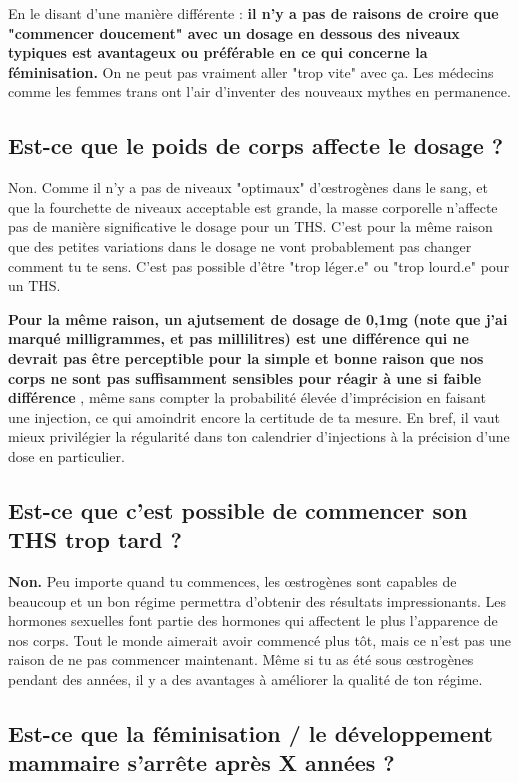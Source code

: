 \documentclass{article}
\begin{document}
En le disant d'une manière différente : \textbf{il n'y a pas de raisons de croire que "commencer doucement" avec un dosage en dessous des niveaux typiques est avantageux ou préférable en ce qui concerne la féminisation.} On ne peut pas vraiment aller "trop vite" avec ça. Les médecins comme les femmes trans ont l'air d'inventer des nouveaux mythes en permanence. 

\subsection{Est-ce que le poids de corps affecte le dosage ?}

Non. Comme il n'y a pas de niveaux "optimaux" d'œstrogènes dans le sang, et que la fourchette de niveaux acceptable est grande, la masse corporelle n'affecte pas de manière significative le dosage pour un THS. C'est pour la même raison que des petites variations dans le dosage ne vont probablement pas changer comment tu te sens. C'est pas possible d'être "trop léger.e" ou "trop lourd.e" pour un THS.

\textbf{Pour la même raison, un ajutsement de dosage de 0,1mg (note que j'ai marqué milligrammes, et pas millilitres) est une différence qui ne devrait pas être perceptible pour la simple et bonne raison que nos corps ne sont pas suffisamment sensibles pour réagir à une si faible différence} , même sans compter la probabilité élevée d'imprécision en faisant une injection, ce qui amoindrit encore la certitude de ta mesure. En bref, il vaut mieux privilégier la régularité dans ton calendrier d'injections à la précision d'une dose en particulier.

\subsection{Est-ce que c'est possible de commencer son THS trop tard ?}\label{11-5}

\textbf{Non.} Peu importe quand tu commences, les œstrogènes sont capables de beaucoup et un bon régime permettra d'obtenir des résultats impressionants. Les hormones sexuelles font partie des hormones qui affectent le plus l'apparence de nos corps. Tout le monde aimerait avoir commencé plus tôt, mais ce n'est pas une raison de ne pas commencer maintenant. Même si tu as été sous œstrogènes pendant des années, il y a des avantages à améliorer la qualité de ton régime.

\subsection{Est-ce que la féminisation / le développement mammaire s'arrête après X années ?}\label{11-6}
\end{document}
